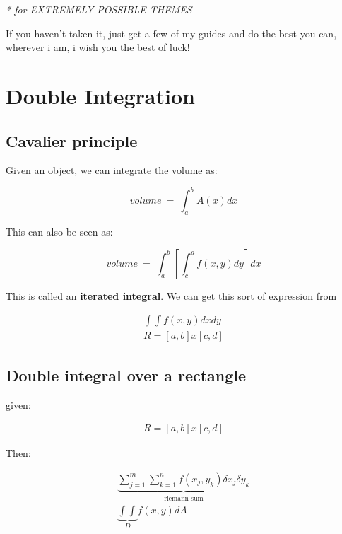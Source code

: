 \documentclass[11pt,fleqn]{book} %
\begin{document}
\textit{* for EXTREMELY POSSIBLE THEMES}

If you haven't taken it, just get a few of my guides and do the best you can, wherever i am, i wish 
you the best of luck!




\chapter{Double Integration}
\section{Cavalier principle}
Given an object, we can integrate the volume as:

\begin{equation}
    volume\ = \ \int_a^b A(x) dx
\end{equation}

This can also be seen as:

\begin{equation}
    volume\ = \ \int_a^b [\int_c^d f(x,y) dy] dx
\end{equation}

This is called an \textbf{iterated integral}. We can get this sort of expression from 


\begin{gather}
    \int \int f(x,y) dxdy\\
    R = [a , b] x [c,d]
\end{gather}

\section{Double integral over a rectangle}
given:

\begin{gather}
    R = [a , b] x [c,d]
\end{gather}

Then:

\begin{gather}
    \underbrace{\sum_{j=1}^m \sum_{k=1}^n f(x_j,y_k) \delta x_j \delta y_k
    }_{\text{riemann sum}}
    \\ \underbrace{\int \int}_D f(x,y) dA
\end{gather}
\end{document}
